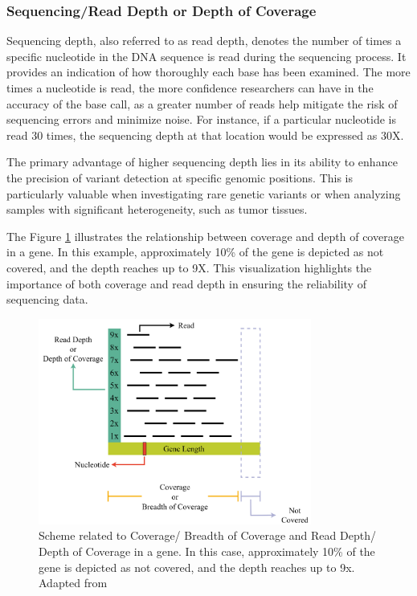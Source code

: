 \subsubsection{\textbf{Sequencing/Read Depth or Depth of Coverage}} \label{subsubsec:ngs_ard}

Sequencing depth, also referred to as read depth, denotes the number of times a specific nucleotide in the DNA sequence is read during the sequencing process. It provides an indication of how thoroughly each base has been examined. The more times a nucleotide is read, the more confidence researchers can have in the accuracy of the base call, as a greater number of reads help mitigate the risk of sequencing errors and minimize noise. For instance, if a particular nucleotide is read 30 times, the sequencing depth at that location would be expressed as 30X. \cite{3billion2023}

The primary advantage of higher sequencing depth lies in its ability to enhance the precision of variant detection at specific genomic positions. This is particularly valuable when investigating rare genetic variants or when analyzing samples with significant heterogeneity, such as tumor tissues. \cite{3billion2023}

The Figure \ref{fig:depth_coverage} illustrates the relationship between coverage and depth of coverage in a gene. In this example, approximately 10\% of the gene is depicted as not covered, and the depth reaches up to 9X. This visualization highlights the importance of both coverage and read depth in ensuring the reliability of sequencing data.

\begin{figure}[H]
    \centering
    \includegraphics[width=0.8\textwidth]{figs/depth_coverage.png}
    \caption{Scheme related to Coverage/ Breadth of Coverage and Read Depth/ Depth of Coverage in a gene. In this case, approximately 10\% of the gene is depicted as not covered, and the depth reaches up to 9x. Adapted from \cite{MedGenome2020}} 
    \label{fig:depth_coverage}
\end{figure}

